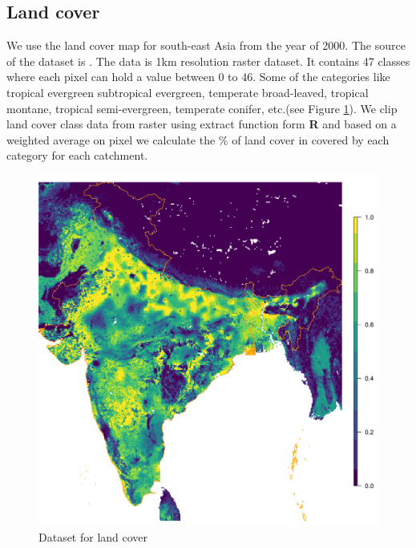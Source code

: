 \documentclass[a4paper, 12pt]{article}
\begin{document}
\subsection{Land cover} 
We use the land cover map for south-east Asia from the year of 2000. The source of the dataset is \citet{stibig2003land}. The data is 1km resolution raster dataset. It contains 47 classes where each pixel can hold a value between 0 to 46. Some of the categories like tropical evergreen subtropical evergreen, temperate broad-leaved, tropical montane, tropical semi-evergreen, temperate conifer, etc.(see Figure \ref{fig:lc}). We clip land cover class data from raster using extract function form \textbf{R} and based on a weighted average on pixel we calculate the \% of land cover in covered by each category for each catchment.

\begin{figure}[!h]
\includegraphics[width = 1\textwidth]{Figures/LC.png}
\caption{Dataset for land cover}
\label{fig:lc}
\end{figure}
\end{document}

